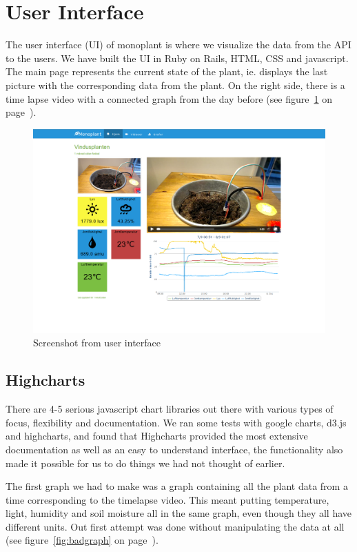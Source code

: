 \section{User Interface}
The user interface (UI) of monoplant is where we visualize the data from the API to the users. We have built the UI in Ruby on Rails, HTML, CSS and javascript. The main page represents the current state of the plant, ie. displays the last picture with the corresponding data from the plant. On the right side, there is a time lapse video with a connected graph from the day before (see figure~\ref{fig:mainpage} on page~\pageref{fig:mainpage}).

\begin{figure}
\centering
\includegraphics[width=1\textwidth]{img/interface/mainpage.png}
\caption{Screenshot from user interface}
\label{fig:mainpage}
\end{figure}

\subsection{Highcharts}
There are 4-5 serious javascript chart libraries out there with various types of focus, flexibility and documentation. We ran some tests with google charts, d3.js and highcharts, and found that Highcharts provided the most extensive documentation as well as an easy to understand interface, the functionality also made it possible for us to do things we had not thought of earlier.

The first graph we had to make was a graph containing all the plant data from a time corresponding to the timelapse video. This meant putting temperature, light, humidity and soil moisture all in the same graph, even though they all have different units. Out first attempt was done without manipulating the data at all (see figure~\ref{fig:badgraph} on page~\pageref{fig:badgraph}). 

